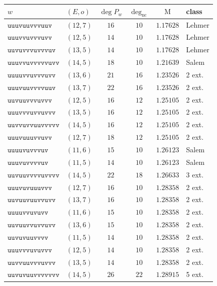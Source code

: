 \begin{table}[h]
\centering\small
\renewcommand{\arraystretch}{1.2}
\begin{tabular}{@{}llcccl@{}}
\toprule
$w$ & $(E,o)$ & $\deg P_w$ & $\deg_{\mathrm{nc}}$ & $\mathrm{M}$ & class\\
\midrule
$\mathtt{uuuvuuvvvuuv}$ & $(12,7)$ & $16$ & $10$ & $1.17628$ & Lehmer \\
$\mathtt{uuuvvuvvvuvv}$ & $(12,5)$ & $14$ & $10$ & $1.17628$ & Lehmer \\
$\mathtt{uuvuvvvuvvvuv}$ & $(13,5)$ & $14$ & $10$ & $1.17628$ & Lehmer \\
$\mathtt{uuuvvuvvvvvuvv}$ & $(14,5)$ & $18$ & $10$ & $1.21639$ & Salem \\
$\mathtt{uuuuvvuvvvuvv}$ & $(13,6)$ & $21$ & $16$ & $1.23526$ & 2 ext. \\
$\mathtt{uuuvuuvvvvuuv}$ & $(13,7)$ & $22$ & $16$ & $1.23526$ & 2 ext. \\
$\mathtt{uuvuuvvvuvvv}$ & $(12,5)$ & $16$ & $12$ & $1.25105$ & 2 ext. \\
$\mathtt{uuuvvvuvvuvvv}$ & $(13,5)$ & $16$ & $12$ & $1.25105$ & 2 ext. \\
$\mathtt{uuvvuvvuuvvvvv}$ & $(14,5)$ & $16$ & $12$ & $1.25105$ & 2 ext. \\
$\mathtt{uuuvuuuvvuvv}$ & $(12,7)$ & $18$ & $12$ & $1.25105$ & 2 ext. \\
$\mathtt{uuuuvuvvvuv}$ & $(11,6)$ & $15$ & $10$ & $1.26123$ & Salem \\
$\mathtt{uuuvuvvvvuv}$ & $(11,5)$ & $14$ & $10$ & $1.26123$ & Salem \\
$\mathtt{uuvuuvvvvuvvvv}$ & $(14,5)$ & $22$ & $18$ & $1.26633$ & 3 ext. \\
$\mathtt{uuuvuvuuuvvv}$ & $(12,7)$ & $16$ & $10$ & $1.28358$ & 2 ext. \\
$\mathtt{uuvuuvuuvvuvv}$ & $(13,7)$ & $16$ & $10$ & $1.28358$ & 2 ext. \\
$\mathtt{uuuuvvuvuvv}$ & $(11,6)$ & $15$ & $10$ & $1.28358$ & 2 ext. \\
$\mathtt{uuvuuvvuvvuvv}$ & $(13,6)$ & $15$ & $10$ & $1.28358$ & 2 ext. \\
$\mathtt{uuvuvuuvvvv}$ & $(11,5)$ & $14$ & $10$ & $1.28358$ & 2 ext. \\
$\mathtt{uuuvvvuvuvvv}$ & $(12,5)$ & $14$ & $10$ & $1.28358$ & 2 ext. \\
$\mathtt{uuvvuuvvvuvvv}$ & $(13,5)$ & $14$ & $10$ & $1.28358$ & 2 ext. \\
$\mathtt{uuvuvuuvvvvvvv}$ & $(14,5)$ & $26$ & $22$ & $1.28915$ & 5 ext. \\

\end{tabular}
\end{table}
